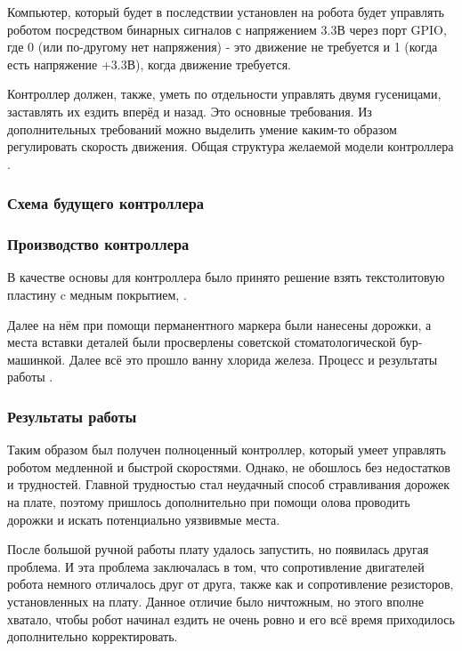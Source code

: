 Компьютер, который будет в последствии установлен на робота будет управлять роботом посредством бинарных сигналов с напряжением 3.3В через порт GPIO, где 0 (или по-другому нет напряжения) - это движение не требуется и 1 (когда есть напряжение +3.3В), когда движение требуется.

Контроллер должен, также, уметь по отдельности управлять двумя гусеницами, заставлять их ездить вперёд и назад. Это основные требования. Из дополнительных требований можно выделить умение каким-то образом регулировать скорость движения. Общая структура желаемой модели контроллера . 

\subsubsection{Схема будущего контроллера}


\subsubsection{Производство контроллера}

В качестве основы для контроллера было принято решение взять текстолитовую пластину c медным покрытием, .
	
Далее на нём при помощи перманентного маркера были нанесены дорожки, а места вставки деталей были просверлены советской стоматологической бур-машинкой. Далее всё это прошло ванну хлорида железа. Процесс и результаты работы .
	
\subsubsection{Результаты работы}

Таким образом был получен полноценный контроллер, который умеет управлять роботом медленной и быстрой скоростями. Однако, не обошлось без недостатков и трудностей. Главной трудностью стал неудачный способ стравливания дорожек на плате, поэтому пришлось дополнительно при помощи олова проводить дорожки и искать потенциально уязвивмые места.

После большой ручной работы плату удалось запустить, но появилась другая проблема. И эта проблема заключалась в том, что сопротивление двигателей робота немного отличалось друг от друга, также как и сопротивление резисторов, установленных на плату. Данное отличие было ничтожным, но этого вполне хватало, чтобы робот начинал ездить не очень ровно и его всё время приходилось дополнительно корректировать.

